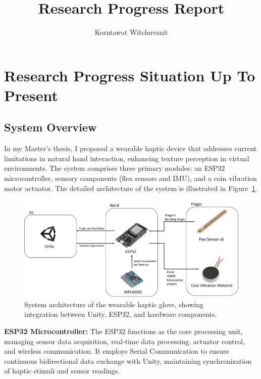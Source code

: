 \documentclass[graybox]{svmult}
\begin{document}
\title*{\centering Research Progress Report}

\author{\hfill Korntawat Witchuvanit}


\maketitle
\vspace{-100pt} 
\section{Research Progress Situation Up To Present}\label{sec:Present Research}

\subsection{System Overview}
\label{sec:System Overview}
In my Master's thesis, I proposed a wearable haptic device that addresses current limitations in natural hand interaction, enhancing texture perception in virtual environments. The system comprises three primary modules: an ESP32 microcontroller, sensory components (flex sensors and IMU), and a coin vibration motor actuator. The detailed architecture of the system is illustrated in Figure~\ref{fig:system_diagram}.

\begin{figure}\centering
	\includegraphics[width=1\textwidth]{figure/system diagram.png}%
	\caption{System architecture of the wearable haptic glove, showing integration between Unity, ESP32, and hardware components.}\label{fig:system_diagram}
\end{figure}
\textbf{ESP32 Microcontroller:}
The ESP32 functions as the core processing unit, managing sensor data acquisition, real-time data processing, actuator control, and wireless communication. It employs Serial Communication to ensure continuous bidirectional data exchange with Unity, maintaining synchronization of haptic stimuli and sensor readings.
\end{document}
